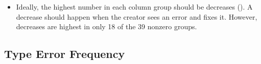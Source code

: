 \documentclass[english,submission,cleveref]{programming}
\begin{document}
\begin{itemize}
  \item
    Ideally, the highest number in each column group should
    be decreases (\dropsym{}).
    A decrease should happen when the creator sees an error and
    fixes it.
    However, decreases are highest in only 18 of the 39 nonzero groups.




\end{itemize}



\subsection{Type Error Frequency}
\label{s:type-error-count}
\end{document}

